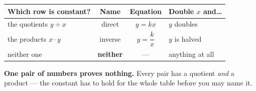 \documentclass[aspectratio=169, 11pt]{beamer}
\begin{document}
\begin{frame}[t, plain]
  \centering
  \renewcommand{\arraystretch}{1.5}
  \begin{tabular}{|l|c|c|l|}
  \hline
  \textbf{Which row is constant?} & \textbf{Name} & \textbf{Equation} & \textbf{Double $x$ and\dots} \\ \hline
  the quotients $y\div x$ & direct & $y=kx$ & $y$ doubles \\ \hline
  the products $x\cdot y$ & inverse & $y=\dfrac kx$ & $y$ is halved \\ \hline
  neither one & \textbf{neither} & --- & anything at all \\ \hline
  \end{tabular}

  \vspace{8pt}
  \begin{block}{}
    \centering \textbf{One pair of numbers proves nothing.} Every pair has a quotient \emph{and} a
    product --- the constant has to hold for the whole table before you may name it.
  \end{block}
\end{frame}
\end{document}
